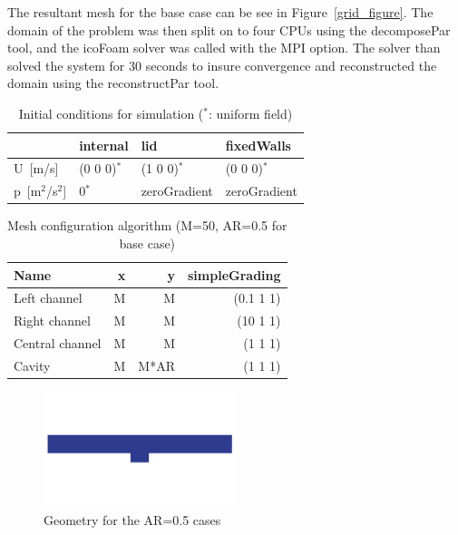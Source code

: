 \documentclass[twocolumn,10pt]{asme2ej}
\begin{document}
The resultant mesh for the base case can be see in Figure~\ref{grid_figure}. The domain of the problem was then split on to four CPUs using the decomposePar tool, and the icoFoam solver was called with the MPI option. The solver than solved the system for 30 seconds to insure convergence and reconstructed the domain using the reconstructPar tool.

\begin{table}[bt]
\begin{center}
\begin{tabular}{| l | l | l | l | }
\hline
                         & internal     & lid          & fixedWalls   \\
\hline
U~[m/s]                  & (0 0 0)$^*$  & (1 0 0)$^*$     & (0 0 0)$^*$  \\
p~[m$^2$/s$^2$]          & 0$^*$        & zeroGradient    & zeroGradient \\
\hline
\end{tabular}
\caption{Initial conditions for simulation ($^*$: uniform field)}
\label{initial_conditions}
\end{center}
\end{table}

\begin{table}[bt]
\begin{center}
\begin{tabular}{| l | r r r | }
\hline
Name          & x  &  y & simpleGrading \\
\hline
Left channel    & M &  M    & (0.1 1 1) \\
Right channel   & M &  M    & (10  1 1) \\
Central channel & M &  M    & (1   1 1) \\
Cavity          & M &  M*AR & (1   1 1) \\
\hline
\end{tabular}
\caption{Mesh configuration algorithm (M=50, AR=0.5 for base case)}
\label{mesh_generation}
\end{center}
\end{table}

\begin{figure}[tb]
\begin{center}
\includegraphics[width=0.5\textwidth]{figure/geometry.pdf}
\caption{Geometry for the AR=0.5 cases}
\label{geometry_figure}
\end{center}
\end{figure}
\end{document}
